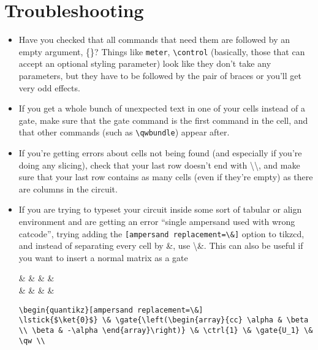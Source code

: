 \documentclass[aps,pra,10pt,nofootinbib]{revtex4}
\begin{document}
\section{Troubleshooting}\label{sec:trouble}
\begin{itemize}
\item Have you checked that all commands that need them are followed by an empty argument, \{\}? Things like \verb!meter!, \verb!\control! (basically, those that can accept an optional styling parameter) look like they don't take any parameters, but they have to be followed by the pair of braces or you'll get very odd effects.
\item If you get a whole bunch of unexpected text in one of your cells instead of a gate, make sure that the gate command is the first command in the cell, and that other commands (such as \verb!\qwbundle!) appear after.
\item If you're getting errors about cells not being found (and especially if you're doing any slicing), check that your last row doesn't end with \textbackslash\textbackslash, and make sure that your last row contains as many cells (even if they're empty) as there are columns in the circuit.
\item If you are trying to typeset your circuit inside some sort of tabular or align environment and are getting an error ``single ampersand used with wrong catcode'', trying adding the \verb![ampersand replacement=\&]! option to tikzcd, and instead of separating every cell by \&, use \textbackslash\&. This can also be useful if you want to insert a normal matrix as a gate
\begin{Code}
\begin{center}
\begin{quantikz}[ampersand replacement=\&]
 \&  \&  \&  \& \qw \\
 \& \qw \& \targ{} \&  \& \qw
\end{quantikz}
\end{center}
\tcblower
\begin{lstlisting}
\begin{quantikz}[ampersand replacement=\&]
\lstick{$\ket{0}$} \& \gate{\left(\begin{array}{cc} \alpha & \beta \\ \beta & -\alpha \end{array}\right)} \& \ctrl{1} \& \gate{U_1} \& \qw \\

\end{lstlisting}
\end{Code}
\end{itemize}
\end{document}
